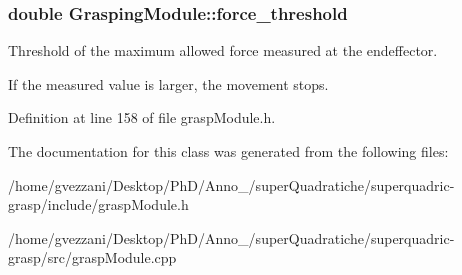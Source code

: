 \subsubsection[{\texorpdfstring{force\+\_\+threshold}{force_threshold}}]{\setlength{\rightskip}{0pt plus 5cm}double Grasping\+Module\+::force\+\_\+threshold\hspace{0.3cm}{\ttfamily [protected]}}\label{classGraspingModule_abd2e8eaca9dd18e74a40fd3831922c16}


Threshold of the maximum allowed force measured at the endeffector. 

If the measured value is larger, the movement stops. 

Definition at line 158 of file grasp\+Module.\+h.



The documentation for this class was generated from the following files\+:\begin{DoxyCompactItemize}
\item 
/home/gvezzani/\+Desktop/\+Ph\+D/\+Anno\+\_/super\+Quadratiche/superquadric-\/grasp/include/grasp\+Module.\+h\item 
/home/gvezzani/\+Desktop/\+Ph\+D/\+Anno\+\_/super\+Quadratiche/superquadric-\/grasp/src/grasp\+Module.\+cpp\end{DoxyCompactItemize}
